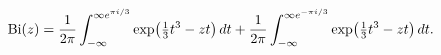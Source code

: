 \[\mathop{\mathrm{Bi}\/}\nolimits\!\left(z\right)=\frac{1}{2\pi}\int_{-\infty}^{%
\infty e^{\pi i/3}}\mathop{\exp\/}\nolimits\!\left(\tfrac{1}{3}t^{3}-zt\right)%
dt+\dfrac{1}{2\pi}\int_{-\infty}^{\infty e^{-\pi i/3}}\mathop{\exp\/}\nolimits%
\!\left(\tfrac{1}{3}t^{3}-zt\right)dt.\]